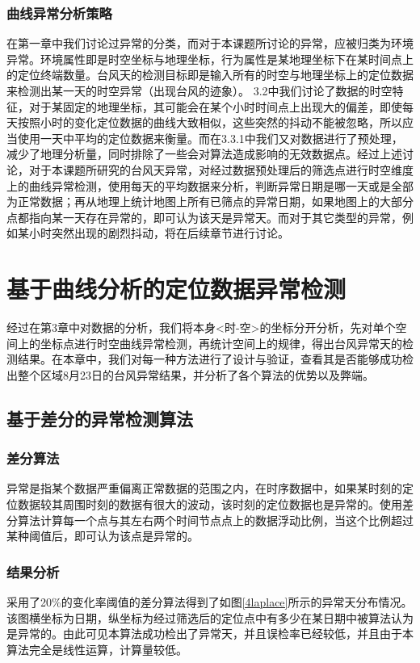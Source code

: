 \documentclass[a4paper,AutoFakeBold,oneside,12pt]{book}
\begin{document}
{{\subsection{曲线异常分析策略}
	在第一章中我们讨论过异常的分类，而对于本课题所讨论的异常，应被归类为环境异常。环境属性即是时空坐标与地理坐标，行为属性是某地理坐标下在某时间点上的定位终端数量。台风天的检测目标即是输入所有的时空与地理坐标上的定位数据来检测出某一天的时空异常（出现台风的迹象）。
	3.2中我们讨论了数据的时空特征，对于某固定的地理坐标，其可能会在某个小时时间点上出现大的偏差，即使每天按照小时的变化定位数据的曲线大致相似，这些突然的抖动不能被忽略，所以应当使用一天中平均的定位数据来衡量。而在3.3.1中我们又对数据进行了预处理，减少了地理分析量，同时排除了一些会对算法造成影响的无效数据点。经过上述讨论，对于本课题所研究的台风天异常，对经过数据预处理后的筛选点进行时空维度上的曲线异常检测，使用每天的平均数据来分析，判断异常日期是哪一天或是全部为正常数据；再从地理上统计地图上所有已筛点的异常日期，如果地图上的大部分点都指向某一天存在异常的，即可认为该天是异常天。而对于其它类型的异常，例如某小时突然出现的剧烈抖动，将在后续章节进行讨论。


\chapter{基于曲线分析的定位数据异常检测}
	经过在第3章中对数据的分析，我们将本身<时-空>的坐标分开分析，先对单个空间上的坐标点进行时空曲线异常检测，再统计空间上的规律，得出台风异常天的检测结果。在本章中，我们对每一种方法进行了设计与验证，查看其是否能够成功检出整个区域8月23日的台风异常结果，并分析了各个算法的优势以及弊端。

\section{基于差分的异常检测算法}
\subsection{差分算法}
	异常是指某个数据严重偏离正常数据的范围之内，在时序数据中，如果某时刻的定位数据较其周围时刻的数据有很大的波动，该时刻的定位数据也是异常的。使用差分算法计算每一个点与其左右两个时间节点点上的数据浮动比例，当这个比例超过某种阈值后，即可认为该点是异常的。
\subsection{结果分析}
	采用了20\%的变化率阈值的差分算法得到了如图\ref{4laplace}所示的异常天分布情况。该图横坐标为日期，纵坐标为经过筛选后的定位点中有多少在某日期中被算法认为是异常的。由此可见本算法成功检出了异常天，并且误检率已经较低，并且由于本算法完全是线性运算，计算量较低。

}}
\end{document}

